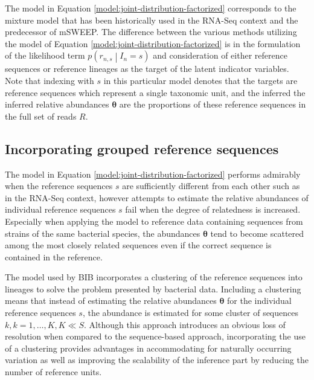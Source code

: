 \documentclass[officiallayout]{tktla}
\begin{document}
The model in Equation \eqref{model:joint-distribution-factorized}
corresponds to the mixture model that has been historically used in
the RNA-Seq context and the predecessor of mSWEEP. The difference
between the various methods utilizing the model of Equation
\eqref{model:joint-distribution-factorized} is in the formulation of the
likelihood term $p\left(r_{n, s} \middle| I_{n} = s\right)$ and
consideration of either reference sequences or reference lineages as
the target of the latent indicator variables. Note that indexing with
$s$ in this particular model denotes that the targets are reference
sequences which represent a single taxonomic unit, and the inferred
the inferred relative abundances $\boldsymbol\theta$ are the
proportions of these reference sequences in the full set of reads $R$.

\subsection{Incorporating grouped reference sequences}

The model in Equation \eqref{model:joint-distribution-factorized}
performs admirably when the reference sequences $s$ are sufficiently
different from each other such as in the RNA-Seq context, however
attempts to estimate the relative abundances of individual reference
sequences $s$ fail when the degree of relatedness is
increased. Especially when applying the model to reference data
containing sequences from strains of the same bacterial species, the
abundances $\boldsymbol\theta$ tend to become scattered among the most
closely related sequences \textemdash{ } even if the correct sequence
is contained in the reference.

The model used by BIB incorporates a clustering of the reference
sequences into lineages to solve the problem presented by bacterial
data. Including a clustering means that instead of estimating the
relative abundances $\boldsymbol\theta$ for the individual reference
sequences $s$, the abundance is estimated for some cluster of
sequences $k, k = 1, \dots, K, K \ll S$. Although this approach
introduces an obvious loss of resolution when compared to the
sequence-based approach, incorporating the use of a clustering
provides advantages in accommodating for naturally occurring variation
as well as improving the scalability of the inference part by reducing
the number of reference units.
\end{document}
